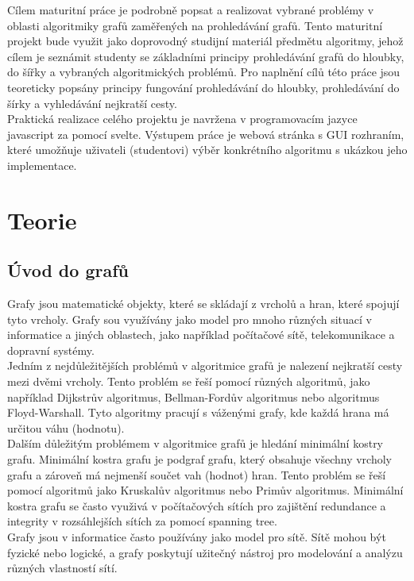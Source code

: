 \documentclass[12pt, titlepage, a4paper]{article}
\begin{document}
Cílem maturitní práce je podrobně popsat a realizovat vybrané problémy v oblasti 
algoritmiky grafů zaměřených na prohledávání grafů.
Tento maturitní projekt bude využit jako doprovodný studijní materiál předmětu 
algoritmy, jehož cílem je seznámit studenty se základními principy 
prohledávání grafů do hloubky, do šířky a vybraných algoritmických problémů. 
Pro naplnění cílů této práce jsou teoreticky popsány principy fungování prohledávání do hloubky,
prohledávání do šírky a vyhledávání nejkratší cesty.
\\

Praktická realizace celého projektu je navržena v programovacím jazyce javascript za pomocí svelte. 
Výstupem práce je webová stránka s GUI rozhraním, které umožňuje uživateli (studentovi) výběr konkrétního 
algoritmu s ukázkou jeho implementace.

\clearpage

\section{Teorie}
\subsection{Úvod do grafů}
Grafy jsou matematické objekty, které se skládají z vrcholů a hran, které spojují tyto 
vrcholy. Grafy sou využívány jako model pro mnoho různých situací v informatice a jiných 
oblastech, jako například počítačové sítě, telekomunikace a dopravní systémy.
\\

Jedním z nejdůležitějších problémů v algoritmice grafů je nalezení nejkratší cesty mezi 
dvěmi vrcholy. Tento problém se řeší pomocí různých algoritmů, jako například Dijkstrův 
algoritmus, Bellman-Fordův algoritmus nebo algoritmus Floyd-Warshall. Tyto algoritmy 
pracují s váženými grafy, kde každá hrana má určitou váhu (hodnotu).
\\

Dalším důležitým problémem v algoritmice grafů je hledání minimální kostry grafu. Minimální 
kostra grafu je podgraf grafu, který obsahuje všechny vrcholy grafu a zároveň má nejmenší 
součet vah (hodnot) hran. Tento problém se řeší pomocí algoritmů jako Kruskalův algoritmus nebo Primův 
algoritmus. Minimální kostra grafu se často využivá v počítačových sítích pro zajištění redundance
a integrity v rozsáhlejších sítích za pomocí spanning tree.
\\

Grafy jsou v informatice často používány jako model pro sítě. Sítě mohou být fyzické nebo 
logické, a grafy poskytují užitečný nástroj pro modelování a analýzu různých vlastností sítí.
\\
\end{document}

